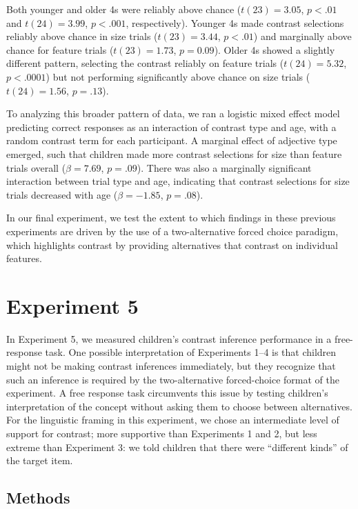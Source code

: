 \documentclass[man]{apa2}
\begin{document}
Both younger and older 4s were reliably above chance ($t(23) = 3.05$, $p<.01$ and $t(24) = 3.99$, $p<.001$, respectively). Younger 4s made contrast selections reliably above chance in size trials ($t(23)=3.44$, $p<.01$) and marginally above chance for feature trials ($t(23)=1.73$, $p=0.09$). Older 4s showed a slightly different pattern, selecting the contrast reliably on feature trials ($t(24)=5.32$, $p<.0001$) but not performing significantly above chance on size trials ($t(24)=1.56$, $p=.13$). 

To analyzing this broader pattern of data, we ran a logistic mixed effect model predicting correct responses as an interaction of contrast type and age, with a random contrast term for each participant.  A marginal effect of adjective type emerged, such that children made more contrast selections for size than feature trials overall ($\beta = 7.69$, $p = .09$). There was also a marginally significant interaction between trial type and age, indicating that contrast selections for size trials decreased with age ($\beta = -1.85$, $p = .08$). 

In our final experiment, we test the extent to which findings in these previous experiments are driven by the use of a two-alternative forced choice paradigm, which highlights contrast by providing alternatives that contrast on individual features.

\section{Experiment 5} 

In Experiment 5, we measured children's contrast inference performance in a free-response task. One possible interpretation of Experiments 1--4 is that children might not be making contrast inferences immediately, but they recognize that such an inference is required by the two-alternative forced-choice format of the experiment. A free response task circumvents this issue by testing children's interpretation of the concept without asking them to choose between alternatives. For the linguistic framing in this experiment, we chose an intermediate level of support for contrast; more supportive than Experiments 1 and 2, but less extreme than Experiment 3: we told children that there were ``different kinds'' of the target item.

\subsection{Methods}
\end{document}
